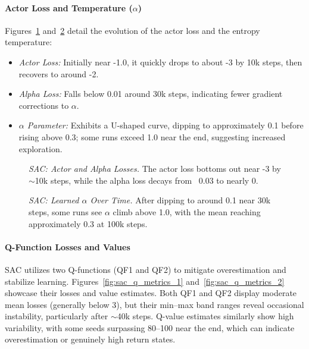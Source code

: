 \paragraph{Actor Loss and Temperature ($\alpha$)}
Figures~\ref{fig:sac_actor_alpha_losses} and~\ref{fig:sac_alpha} detail the evolution of the actor loss and the entropy temperature:
\begin{itemize}
	\item \emph{Actor Loss:} Initially near -1.0, it quickly drops to about -3 by 10k steps, then recovers to around -2.
	\item \emph{Alpha Loss:} Falls below 0.01 around 30k steps, indicating fewer gradient corrections to $\alpha$.
	\item \emph{$\alpha$ Parameter:} Exhibits a U-shaped curve, dipping to approximately 0.1 before rising above 0.3; some runs exceed 1.0 near the end, suggesting increased exploration.
\end{itemize}

\begin{figure}
	\centering
	\quad
	\caption{\emph{SAC: Actor and Alpha Losses.} The actor loss bottoms out near -3 by $\sim$\num{10}k steps, while the alpha loss decays from ~0.03 to nearly 0.}
	\label{fig:sac_actor_alpha_losses}
\end{figure}

\begin{figure}
	\centering
	
	\caption{\emph{SAC: Learned $\alpha$ Over Time.} After dipping to around 0.1 near 30k steps, some runs see $\alpha$ climb above 1.0, with the mean reaching approximately 0.3 at 100k steps.}
	\label{fig:sac_alpha}
\end{figure}

\paragraph{Q-Function Losses and Values}
SAC utilizes two Q-functions (QF1 and QF2) to mitigate overestimation and stabilize learning. Figures~\ref{fig:sac_q_metrics_1} and~\ref{fig:sac_q_metrics_2} showcase their losses and value estimates. Both QF1 and QF2 display moderate mean losses (generally below 3), but their min–max band ranges reveal occasional instability, particularly after $\sim$40k steps. Q-value estimates similarly show high variability, with some seeds surpassing 80–100 near the end, which can indicate overestimation or genuinely high return states.

